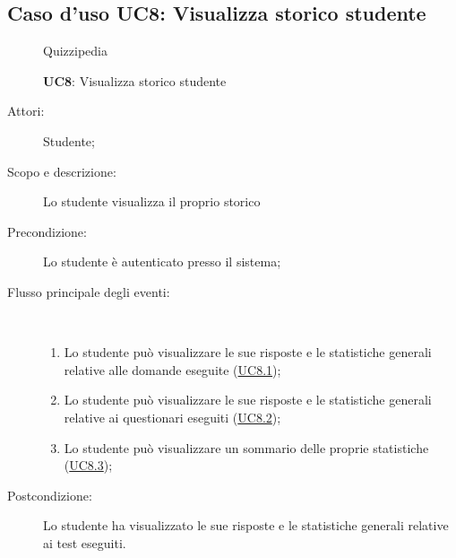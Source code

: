 \subsection{Caso d'uso UC8: Visualizza storico studente}
\begin{figure}[H]
	\centering
	\begin{resizedtikzpicture}{\textwidth}
		\begin{umlsystem}[x=0, fill=lightgray!20]{Quizzipedia}
		\end{umlsystem}
	\end{resizedtikzpicture}
	\caption{\textbf{UC8}: Visualizza storico studente}
	\label{UC8}
\end{figure}
\begin{description}
	\item[Attori:] Studente;
	\item[Scopo e descrizione:] Lo studente visualizza il proprio storico
	\item[Precondizione:] Lo studente è autenticato presso il sistema;
	
	\item[Flusso principale degli eventi:] \ 
	\begin{enumerate}
		\item Lo studente può visualizzare le sue risposte e le statistiche generali relative alle domande eseguite (\hyperlink{UC8.1}{UC8.1});
		\item Lo studente può visualizzare le sue risposte e le statistiche generali relative ai questionari eseguiti (\hyperlink{UC8.2}{UC8.2});
		\item Lo studente può visualizzare un sommario delle proprie statistiche (\hyperlink{UC8.3}{UC8.3});
		
	\end{enumerate}
	\item[Postcondizione:] Lo studente ha visualizzato le sue risposte e le statistiche generali relative ai test eseguiti.
\end{description}
\hypertarget{UC8.1}{}
